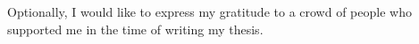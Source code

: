 Optionally, I would like to express my gratitude to a crowd of people who supported me in the time of writing my thesis.


\clearpage
